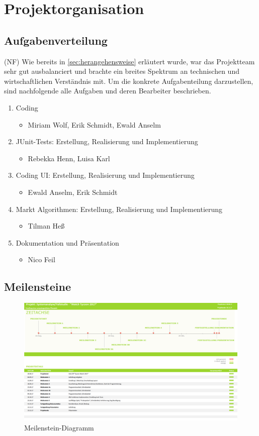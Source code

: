 \clearpage
\chapter{Projektorganisation}
\section{Aufgabenverteilung}
(NF) Wie bereits in \ref{sec:herangehensweise} erläutert wurde, war das Projektteam sehr gut ausbalanciert und brachte ein breites Spektrum an technischen und wirtschaftlichen Verständnis mit. Um die konkrete Aufgabenteilung darzustellen, sind nachfolgende alle Aufgaben und deren Bearbeiter beschrieben. 
\begin{enumerate}
	\item Coding
	\begin{itemize}
		\item Miriam Wolf, Erik Schmidt, Ewald Anselm
	\end{itemize} 
	\item JUnit-Tests: Erstellung, Realisierung und Implementierung
	\begin{itemize}
		\item Rebekka Henn, Luisa Karl
	\end{itemize} 
	\item Coding UI: Erstellung, Realisierung und Implementierung
	\begin{itemize}
		\item Ewald Anselm, Erik Schmidt
	\end{itemize} 
	\item Markt Algorithmen: Erstellung, Realisierung und Implementierung
	\begin{itemize}
		\item Tilman Heß
	\end{itemize} 	
	\item Dokumentation und Präsentation
	\begin{itemize}
	\item Nico Feil
	\end{itemize}
\end{enumerate}
\clearpage
\section{Meilensteine}\label{sec:meilenstein}
\begin{figure}[!h]
	\centering
	\includegraphics[angle=90, scale=0.29]{img/Meilensteine_Fallstudie.png}
	\caption{Meilenstein-Diagramm} \label{fig:abb34}
\end{figure}
